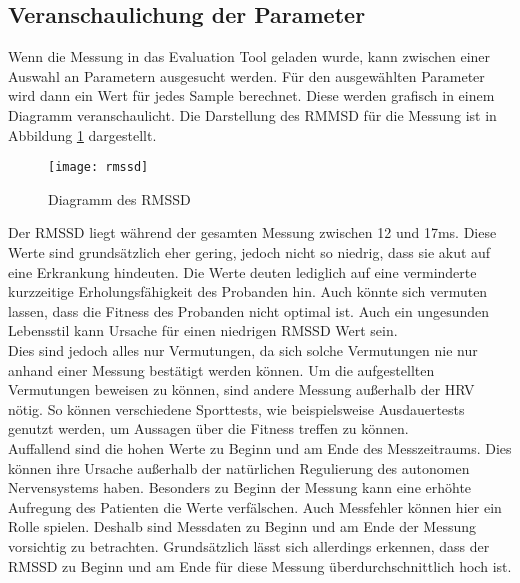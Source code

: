 \subsection{Veranschaulichung der Parameter} \label{sec:anschaulich}
Wenn die Messung in das Evaluation Tool geladen wurde, kann zwischen einer Auswahl an Parametern ausgesucht werden. Für den ausgewählten Parameter wird dann ein Wert für jedes Sample berechnet. Diese werden grafisch in einem Diagramm veranschaulicht. Die Darstellung des RMMSD für die Messung ist in Abbildung \ref{fig:rmssd} dargestellt.
\begin{figure}[H]
	\centering
	\texttt{[image: rmssd]}
	\caption{Diagramm des RMSSD }
	\label{fig:rmssd}
\end{figure}
Der RMSSD liegt während der gesamten Messung zwischen 12 und 17ms. Diese Werte sind grundsätzlich eher gering, jedoch nicht so niedrig, dass sie akut auf eine Erkrankung hindeuten. Die Werte deuten lediglich auf eine verminderte kurzzeitige Erholungsfähigkeit des Probanden hin. Auch könnte sich vermuten lassen, dass die Fitness des Probanden nicht optimal ist. Auch ein ungesunden Lebensstil kann Ursache für einen niedrigen RMSSD Wert sein. \\
Dies sind jedoch alles nur Vermutungen, da sich solche Vermutungen nie nur anhand einer Messung bestätigt werden können. Um die aufgestellten Vermutungen beweisen zu können, sind andere Messung außerhalb der HRV nötig. So können verschiedene Sporttests, wie beispielsweise Ausdauertests genutzt werden, um Aussagen über die Fitness treffen zu können.\\
Auffallend sind die hohen Werte zu Beginn und am Ende des Messzeitraums. Dies können ihre Ursache außerhalb der natürlichen Regulierung des autonomen Nervensystems haben. Besonders zu Beginn der Messung kann eine erhöhte Aufregung des Patienten die Werte verfälschen. Auch Messfehler können hier ein Rolle spielen. Deshalb sind Messdaten zu Beginn und am Ende der Messung vorsichtig zu betrachten. Grundsätzlich lässt sich allerdings erkennen, dass der RMSSD zu Beginn und am Ende für diese Messung überdurchschnittlich hoch ist.


